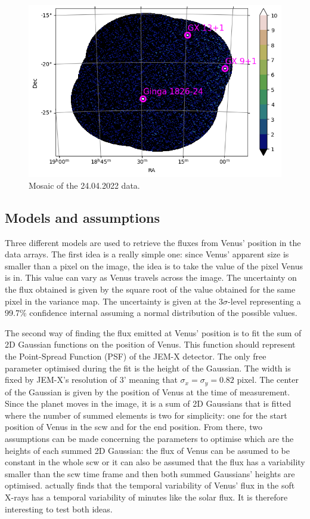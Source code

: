         \begin{figure}[H]
        \centering
        \includegraphics[width = 12cm]{report/Figures/methods/2404/oda_2404.png}
        \caption{Mosaic of the 24.04.2022 data.}
        \label{24_mosaic}
        \end{figure}

    
    \subsection{Models and assumptions}

    Three different models are used to retrieve the fluxes from Venus' position in the data arrays. The first idea is a really simple one: since Venus' apparent size is smaller than a pixel on the image, the idea is to take the value of the pixel Venus is in. This value can vary as Venus travels across the image. The uncertainty on the flux obtained is given by the square root of the value obtained for the same pixel in the variance map. The uncertainty is given at the $3\sigma$-level representing a 99.7\% confidence internal assuming a normal distribution of the possible values.

    The second way of finding the flux emitted at Venus' position is to fit the sum of 2D Gaussian functions on the position of Venus. This function should represent the Point-Spread Function (PSF) of the JEM-X detector. The only free parameter optimised during the fit is the height of the Gaussian. The width is fixed by JEM-X's resolution of 3' meaning that $\sigma_x=\sigma_y=0.82$ pixel. The center of the Gaussian is given by the position of Venus at the time of measurement.  Since the planet moves in the image, it is a sum of 2D Gaussians that is fitted where the number of summed elements is two for simplicity: one for the start position of Venus in the scw and for the end position. From there, two assumptions can be made concerning the parameters to optimise which are the heights of each summed 2D Gaussian: the flux of Venus can be assumed to be constant in the whole scw or it can also be assumed that the flux has a variability smaller than the scw time frame and then both summed Gaussians' heights are optimised. \cite{Dennerl2002DiscoveryChandra} actually finds that the temporal variability of Venus' flux in the soft X-rays has a temporal variability of minutes like the solar flux. It is therefore interesting to test both ideas.

